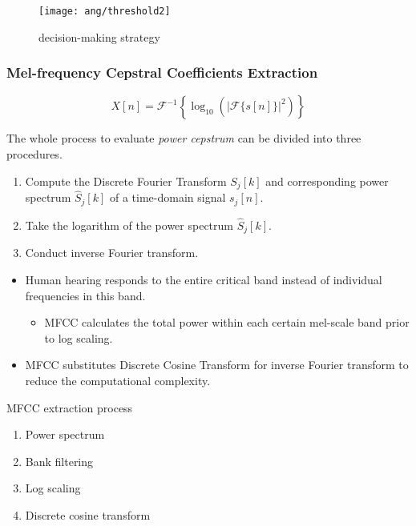 
\begin{frame}
\begin{figure}[H]
\centering
\texttt{[image: ang/threshold2]}
\caption{decision-making strategy}
\end{figure}
\end{frame}


\begin{frame}
\frametitle{Mel-frequency Cepstral Coefficients Extraction}
\begin{equation}
X[n] = \mathcal{F}^{-1} \left\{\log_{10} \left( |\mathcal{F}\{s[n]\}|^2 \right) \right\}
\end{equation}
\vspace{10pt}

The whole process to evaluate \textit{power cepstrum} can be divided into three procedures.
\begin{enumerate}
\item Compute the Discrete Fourier Transform $S_j[k]$ and corresponding power spectrum $\hat{S}_j[k]$ of a time-domain signal $s_j[n]$.
\item Take the logarithm of the power spectrum $\hat{S}_j[k]$.
\item Conduct inverse Fourier transform.
\end{enumerate}
\end{frame}


\begin{frame}
\begin{itemize}
	\item Human hearing responds to the entire critical band instead of individual frequencies in this band.
	\begin{itemize}
		\item MFCC calculates the total power within each certain mel-scale band prior to log scaling.
	\end{itemize}
	\item MFCC substitutes Discrete Cosine Transform for inverse Fourier transform to reduce the computational complexity.
\end{itemize}
\vspace{10pt}

MFCC extraction process
\begin{enumerate}
\item Power spectrum
\item Bank filtering
\item Log scaling
\item Discrete cosine transform
\end{enumerate}
\end{frame}


